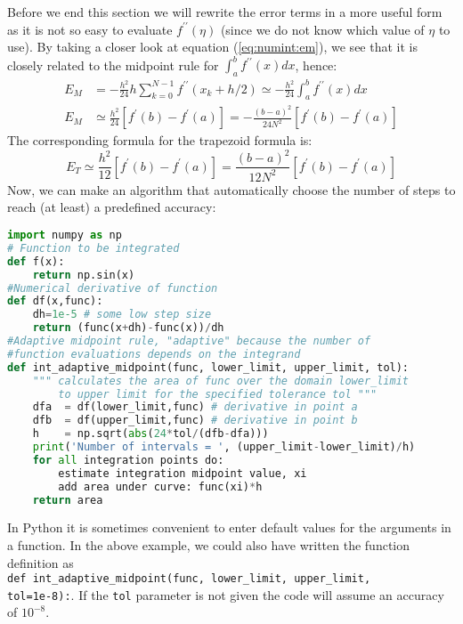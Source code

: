 \documentclass[graybox,sectrefs,envcountresetchap,open=right,final]{svmonodo}
\newenvironment{graybox2admon}[1][]{
\begin{graybox2mdframed}[frametitle=#1]
}
{
\end{graybox2mdframed}
}
\begin{document}
Before we end this section we will rewrite the error terms in a more useful form as it is not so easy to evaluate 
$f^{\prime\prime}(\eta)$ (since we do not know which value of $\eta$ to use). By taking a closer look at equation (\ref{eq:numint:em}), 
we see that it is closely related to the midpoint rule for $\int_a^bf^{\prime\prime}(x)dx$, hence:
\begin{align}
E_{M}&=-\frac{h^2}{24}h
\sum_{k=0}^{N-1}f^{\prime\prime}(x_k+h/2)\simeq-\frac{h^2}{24}\int_a^b
f^{\prime\prime}(x)dx\\ 
E_M&\simeq\frac{h^2}{24}\left[f^\prime(b)-f^\prime(a)\right]=-\frac{(b-a)^2}{24N^2}\left[f^\prime(b)-f^\prime(a)\right]
\end{align}
The corresponding formula for the trapezoid formula is:
\begin{equation}
E_T\simeq \frac{h^2}{12}\left[f^\prime(b)-f^\prime(a)\right]=\frac{(b-a)^2}{12N^2}\left[f^\prime(b)-f^\prime(a)\right]
\end{equation}
Now, we can make an algorithm that automatically choose the number of steps to reach (at least) a predefined accuracy:
\begin{lstlisting}[language=Python,style=blue1bar]
import numpy as np
# Function to be integrated
def f(x):
    return np.sin(x)
#Numerical derivative of function
def df(x,func):
    dh=1e-5 # some low step size
    return (func(x+dh)-func(x))/dh 
#Adaptive midpoint rule, "adaptive" because the number of 
#function evaluations depends on the integrand
def int_adaptive_midpoint(func, lower_limit, upper_limit, tol):
    """ calculates the area of func over the domain lower_limit
        to upper limit for the specified tolerance tol """
    dfa  = df(lower_limit,func) # derivative in point a 
    dfb  = df(upper_limit,func) # derivative in point b
    h    = np.sqrt(abs(24*tol/(dfb-dfa)))
    print('Number of intervals = ', (upper_limit-lower_limit)/h)
    for all integration points do:
        estimate integration midpoint value, xi
        add area under curve: func(xi)*h
    return area
\end{lstlisting}


\begin{graybox2admon}[Notice]
In Python it is sometimes convenient to enter default values for the arguments in a function. In the above example, we could also have written the function definition as\\ \Verb!def int_adaptive_midpoint(func, lower_limit, upper_limit,! \\ \texttt{tol=1e-8):}. If the \texttt{tol} parameter is not given the code will assume an accuracy of $10^{-8}$.
\end{graybox2admon}
\end{document}
